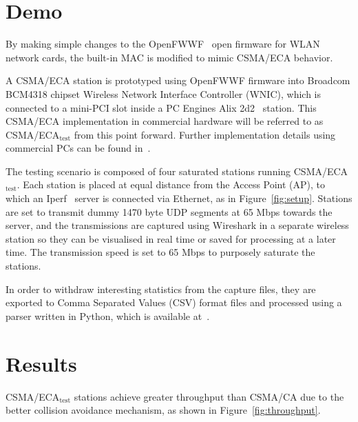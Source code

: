 \documentclass[conference]{IEEEtran}
\begin{document}
\section{Demo}\label{prototype}
By making simple changes to the OpenFWWF~\cite{OpenFWWF} open firmware for WLAN network cards, the built-in MAC is modified to mimic CSMA/ECA behavior.


A CSMA/ECA station is prototyped using OpenFWWF firmware into Broadcom BCM4318 chipset Wireless Network Interface Controller (WNIC), which is connected to a mini-PCI slot inside a PC Engines Alix 2d2~\cite{Alix2d2} station. This CSMA/ECA implementation in commercial hardware will be referred to as CSMA/ECA$_{\text{test}}$ from this point forward. Further implementation details using commercial PCs can be found in~\cite{BECA-test}.

	The testing scenario is composed of four saturated stations running CSMA/ECA$_{\text{test}}$. Each station is placed at equal distance from the Access Point (AP), to which an Iperf~\cite{tirumala2005iperf} server is connected via Ethernet, as in Figure~\ref{fig:setup}. Stations are set to transmit dummy 1470 byte UDP segments at 65 Mbps towards the server, and the transmissions are captured using Wireshark in a separate wireless station so they can be visualised in real time or saved for processing at a later time. The transmission speed is set to 65 Mbps to purposely saturate the stations.
	
	In order to withdraw interesting statistics from the capture files, they are exported to Comma Separated Values (CSV) format files and processed using a parser written in Python, which is available at~\cite{pcapParser}.
	
\section{Results}\label{results}
CSMA/ECA$_{\text{test}}$ stations achieve greater throughput than CSMA/CA due to the better collision avoidance mechanism, as shown in Figure~\ref{fig:throughput}.
\end{document}
